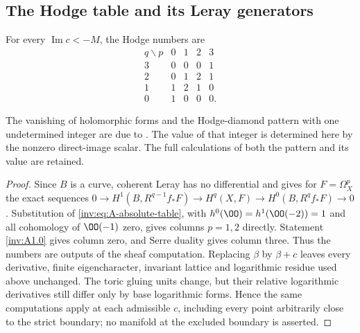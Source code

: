 \subsection{The Hodge table and its Leray generators}

\begin{proposition}\label{inv:A3.1}\label{wb:cor:exact-hodge-diamond}\label{wb:thm:parametric-hodge-diamond}\label{wb:prop:workbench-holomorphic-form-vanishing}
For every $\operatorname{Im}c<-M$, the Hodge numbers are
\[
\begin{array}{c|rrrr}
q\backslash p&0&1&2&3\\\hline
3&0&0&0&1\\
2&0&1&2&1\\
1&1&2&1&0\\
0&1&0&0&0.
\end{array}
\]
\end{proposition}


The vanishing of holomorphic forms and the Hodge-diamond
pattern with one undetermined integer are due to
\citet[Proposition~9.20, p.~80; Theorem~9.1(vi), p.~65]{AC2026}.
The value of that integer is determined here by the nonzero direct-image
scalar. The full calculations of both the pattern and its value are retained.

\begin{proof}
Since $B$ is a curve, coherent Leray has no differential and gives
for $F=\Omega_X^p$ the exact sequences
$0\to H^1(B,R^{q-1}f_*F)\to H^q(X,F)\to H^0(B,R^qf_*F)\to0$.
Substitution of \eqref{inv:eq:A-absolute-table}, with
$h^0(\OO)=h^1(\OO(-2))=1$ and all cohomology of $\OO(-1)$ zero,
gives columns $p=1,2$ directly.  Statement \ref{inv:A1.0} gives column zero,
and Serre duality gives column three.  Thus the numbers are outputs
of the sheaf computation.  Replacing $\beta$ by $\beta+c$ leaves
every derivative, finite eigencharacter, invariant lattice and
logarithmic residue used above unchanged.  The toric gluing units
change, but their relative logarithmic derivatives still differ only
by base logarithmic forms.  Hence the same computations apply at
each admissible $c$, including every point arbitrarily close to the
strict boundary; no manifold at the excluded boundary is asserted.
\end{proof}

